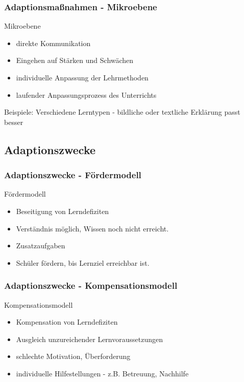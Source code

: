 \documentclass{beamer}
\begin{document}
\begin{frame}
  \frametitle{Adaptionsmaßnahmen - Mikroebene}
  \begin{block}{Mikroebene}
    \begin{itemize}
      \item direkte Kommunikation
      \item Eingehen auf Stärken und Schwächen
      \item individuelle Anpassung der Lehrmethoden
      \item laufender Anpassungsprozess des Unterrichts
    \end{itemize}
  \end{block}

  Beispiele: Verschiedene Lerntypen - bildliche oder textliche Erklärung passt besser
\end{frame}

\subsection{Adaptionszwecke}
\begin{frame}
  \frametitle{Adaptionszwecke - Fördermodell}
  \begin{block}{Fördermodell}
    \begin{itemize}
      \item Beseitigung von Lerndefiziten
      \item Verständnis möglich, Wissen noch nicht erreicht.
      \item Zusatzaufgaben
      \item Schüler fördern, bis Lernziel erreichbar ist.
    \end{itemize}
  \end{block}
\end{frame}

\begin{frame}
  \frametitle{Adaptionszwecke - Kompensationsmodell}
  \begin{block}{Kompensationsmodell}
    \begin{itemize}
      \item Kompensation von Lerndefiziten
      \item Ausgleich unzureichender Lernvoraussetzungen
      \item schlechte Motivation, Überforderung
      \item individuelle Hilfestellungen - z.B. Betreuung, Nachhilfe
    \end{itemize}
  \end{block}
\end{frame}
\end{document}
